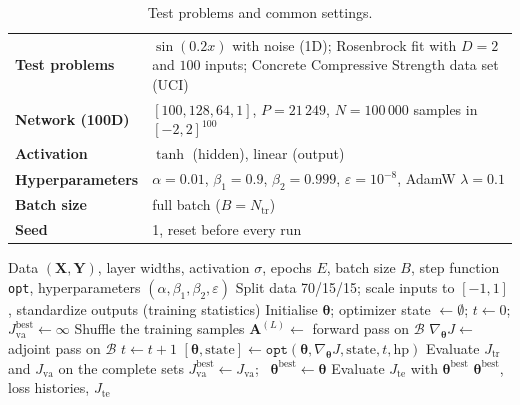 \documentclass[11pt,a4paper]{article}
\begin{document}
\begin{table}[!htbp]
  \centering
  \caption{Test problems and common settings.}
  \label{tab:ann:setup}
  \begin{tabular}{lp{}}
    \toprule
    \textbf{Test problems} & $\sin(0.2x)$ with noise (1D); Rosenbrock fit with $D = 2$ and $100$ inputs; Concrete Compressive Strength data set (UCI) \\
    \textbf{Network (100D)} & $[100, 128, 64, 1]$, $P = 21\,249$, $N = 100\,000$ samples in $[-2,2]^{100}$ \\
    \textbf{Activation} & $\tanh$ (hidden), linear (output) \\
    \textbf{Hyperparameters} & $\alpha = 0.01$, $\beta_1 = 0.9$, $\beta_2 = 0.999$, $\varepsilon = 10^{-8}$, AdamW $\lambda = 0.1$ \\
    \textbf{Batch size} & full batch ($B = N_{\mathrm{tr}}$) \\
    \textbf{Seed} & 1, reset before every run \\
    \bottomrule
  \end{tabular}
\end{table}

\begin{algorithm}[!htbp]
\caption{ANN training with an exchangeable ADAM-type optimizer (\texttt{ADAM\_ANN.m})}
\label{alg:ann}
\begin{algorithmic}[1]
\Require Data $(\bm{X},\bm{Y})$, layer widths, activation $\sigma$, epochs $E$, batch size $B$, step function \texttt{opt}, hyperparameters $(\alpha,\beta_1,\beta_2,\varepsilon)$
\State Split data 70/15/15; scale inputs to $[-1,1]$, standardize outputs (training statistics)
\State Initialise $\bm{\theta}$; optimizer state $\leftarrow\emptyset$; $t\leftarrow0$; $J^{\mathrm{best}}_{\mathrm{va}}\leftarrow\infty$
  \State Shuffle the training samples
    \State $\bm{A}^{(L)} \leftarrow$ forward pass on $\mathcal{B}$ 
    \State $\nabla_{\bm{\theta}} J \leftarrow$ adjoint pass on $\mathcal{B}$ 
    \State $t\leftarrow t+1$
    \State $[\bm{\theta},\text{state}] \leftarrow \texttt{opt}(\bm{\theta},\nabla_{\bm{\theta}}J,\text{state},t,\text{hp})$ 
  \EndFor
  \State Evaluate $J_{\mathrm{tr}}$ and $J_{\mathrm{va}}$ on the complete sets
    \State $J^{\mathrm{best}}_{\mathrm{va}}\leftarrow J_{\mathrm{va}}$; \ $\bm{\theta}^{\mathrm{best}}\leftarrow\bm{\theta}$
  \EndIf
\EndFor
\State Evaluate $J_{\mathrm{te}}$ with $\bm{\theta}^{\mathrm{best}}$
\State \Return $\bm{\theta}^{\mathrm{best}}$, loss histories, $J_{\mathrm{te}}$
\end{algorithmic}
\end{algorithm}
\end{document}
